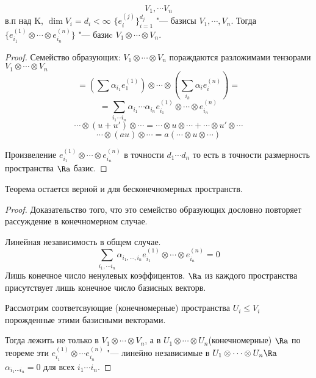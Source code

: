 \begin{theorem}
$$V_1, \cdots V_n$$ в.п над K, $\dim V_i = d_i < \infty$
$\{e_{i}^{(j)}\}_{i = 1}^{d_j}$ "--- базисы $V_1, \cdots, V_n$.
Тогда $\{e_{i_1}^{(1)} \otimes \cdots \otimes e_{i_n}^{(n)}\}$ "--- базиc $V_1 \otimes \cdots \otimes V_n$.
\end{theorem}
\begin{proof}
    Семейство образующих:
    $V_1 \otimes \cdots \otimes V_n$ пораждаются разложимами тензорами $V_1 \otimes \cdots \otimes V_n$
    $$= (\sum \alpha_{i_1} e_1^{(1)}) \otimes \cdots \otimes (\sum_{i_k}\alpha_ie_i^{(n)}) =$$
    $$= \sum_{i_1 \cdots i_n}\alpha_{i_1} \cdots \alpha_{i_n} e_{i_1}^{(1)} \otimes\cdots \otimes e_{i_n}^{(n)}$$
    $$\cdots \otimes (u + u') \otimes \cdots = \cdots \otimes u \otimes \cdots + \cdots \otimes u' \otimes \cdots$$
    $$\cdots \otimes (au) \otimes \cdots = a(\cdots \otimes u \otimes \cdots) $$

    Произвеление $e_{i_1}^{(1)} \otimes \cdots \otimes e_{i_n}^{(n)}$ в точности $d_1 \cdots d_n$ то есть 
    в точности размерность пространства $\Ra$ базис. 
\end{proof}
\begin{Rem}
Теорема остается верной и для бесконечномерных пространств. 
\end{Rem}
\begin{proof}
    Доказательство того, что это семейство образующих дословно повторяет рассуждение в конечномерном случае. 

    Линейная независимость в общем случае. 
    $$\sum_{i_1,  \cdots i_n}\alpha_{i_1,\cdots, i_n}e_{i_1}^{(1)} \otimes \cdots \otimes e_{i_n}^{(n)} = 0$$
    Лишь конечное число ненулевых коэффицентов. 
    $\Ra$ из каждого пространства присутствует лишь конечное число базисных векторв. 

    Рассмотрим соответсвующие (конечномерные) пространства $U_i \le V_i$ порожденные этими базисными векторами. 

    Тогда лежить не только в $V_1 \otimes \cdots \otimes V_n$, а в $U_1 \otimes \cdots \otimes U_n$(конечномерные)
    $\Ra$ по теореме эти $e_{i_1}^{(1)} \otimes \cdots e_{i_n}^{(n)}$ "--- линейно независимые в $U_1 \otimes \cdots \otimes U_n \Ra$
    $\alpha_{i_1 \cdots i_n} = 0$ для всех $i_1 \cdots i_n$. 
\end{proof}
